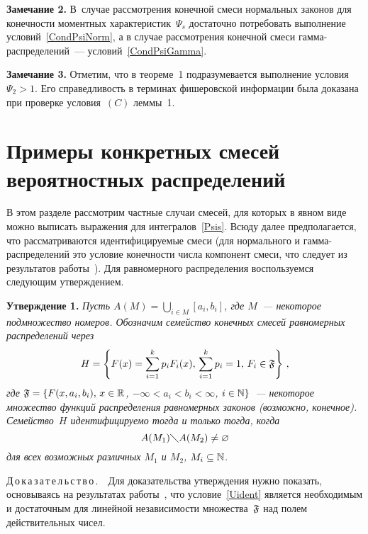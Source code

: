 \begin{multicols}{2}

\noindent
\textbf{Замечание 2.}
В~случае рассмотрения конечной смеси нормальных
законов для конечности моментных характеристик~$\Psi_s$ достаточно
потребовать выполнение условий~\eqref{CondPsiNorm}, а в случае
рассмотрения конечной смеси гам\-ма-рас\-пре\-де\-ле\-ний~---
условий~\eqref{CondPsiGamma}.

\medskip

\noindent
\textbf{Замечание 3.}
Отметим, что в теореме~1 подразумевается
выполнение условия $\Psi_2>1$. Его справедливость в терминах
фишеровской информации была доказана при проверке условия~$(C)$
леммы~1.


\section{Примеры конкретных смесей вероятностных распределений}

В этом разделе рассмотрим частные случаи смесей, для которых в явном
виде можно выписать выражения для интегралов~\eqref{Psis}. Всюду
далее предполагается, что рассматриваются идентифицируемые смеси
(для нормального и гам\-ма-рас\-пре\-де\-ле\-ний это условие конечности чис\-ла
компонент смеси, что следует из результатов
работы~\cite{Teicher1963}). Для равномерного распределения
воспользуемся следующим утверждением.

\medskip

\noindent
\textbf{Утверждение 1.} \textit{Пусть $A(M)=\bigcup\limits_{i\in M}\left[a_i,b_i\right]$, 
где $M$~--- некоторое подмножество номеров. Обозначим семейство конечных смесей
равномерных распределений через
$$
H=\left\{F(x)=\sum\limits_{i=1}^k p_iF_i(x),\,
\sum\limits_{i=1}^k p_i=1,\,F_i\in\mathfrak F\right\}\,,
$$ 
где
$\Fd=\{F(x,a_i,b_i),\,x\hm\in\r$, $-\infty<a_i<b_i<\infty$, $i\hm\in\N\}$~--- 
некоторое множество функций распределения равномерных законов
(возможно, конечное). Семейство~$H$ идентифицируемо тогда и только
тогда, когда
\begin{equation}
\label{Uident} A(M_1)\diagdown A(M_2)\neq\varnothing
\end{equation}
для всех возможных различных $M_1$ и $M_2$, $M_i\subseteq\mathbb N$.}


\noindent
Д\,о\,к\,а\,з\,а\,т\,е\,л\,ь\,с\,т\,в\,о\,.\ \ 
Для доказательства утверж\-де\-ния нужно показать, основываясь на
результатах работы~\cite{Yakowitz1968}, что условие~\eqref{Uident}
является необходимым и достаточным для линейной независимости
множества~$\mathfrak F$ над полем действительных чисел.


\end{multicols}
